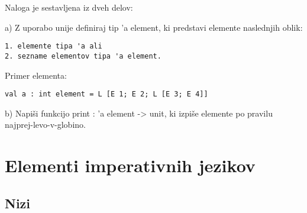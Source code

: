 \begin{ex}Naloga je sestavljena iz dveh delov:

a) Z uporabo unije definiraj tip 'a element, ki predstavi elemente naslednjih oblik:
\begin{lstlisting}
1. elemente tipa 'a ali
2. sezname elementov tipa 'a element.
\end{lstlisting}
    Primer elementa: 
\begin{lstlisting}
val a : int element = L [E 1; E 2; L [E 3; E 4]]
\end{lstlisting}

b) Napi\v si funkcijo print : 'a element -> unit, ki izpi\v se elemente po pravilu                          
    najprej-levo-v-globino.



\end{ex} 

\chapter{Elementi imperativnih jezikov}

\section{Nizi}

